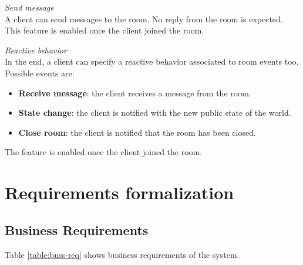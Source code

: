 \bigskip
\textit{Send message}
\\
A client can send messages to the room. No reply from the room is expected.
This feature is enabled once the client joined the room.

\bigskip
\textit{Reactive behavior}
\\
In the end, a client can specify a reactive behavior associated to room events too. Possible events are:
\begin{itemize}
\item \textbf{Receive message}: the client receives a message from the room.
\item \textbf{State change}: the client is notified with the new public state of the world.
\item \textbf{Close room}: the client is notified that the room has been closed.
\end{itemize} 
The feature is enabled once the client joined the room. 

\section{Requirements formalization}

\subsection{Business Requirements}

Table \ref{table:buss-req} shows business requirements of the system.

